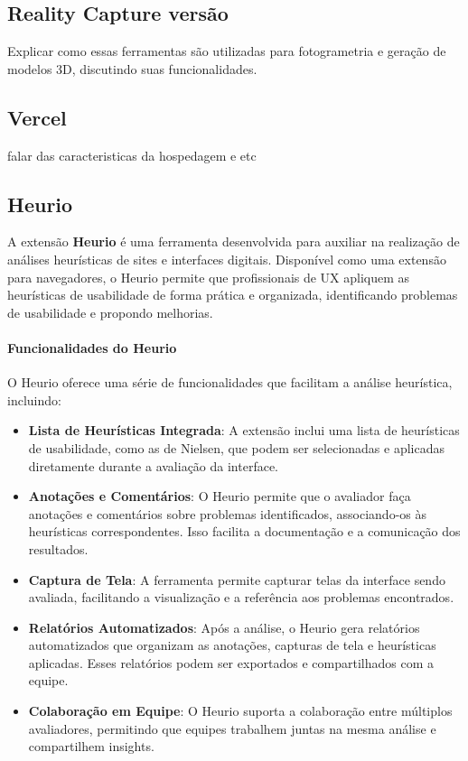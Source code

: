 \subsection{Reality Capture versão}
Explicar como essas ferramentas são utilizadas para fotogrametria e geração de modelos 3D, discutindo suas funcionalidades.

\subsection{Vercel}
falar das caracteristicas da hospedagem e etc

\subsection{Heurio}
A extensão \textbf{Heurio} é uma ferramenta desenvolvida para auxiliar na realização de análises heurísticas de sites e interfaces digitais. Disponível como uma extensão para navegadores, o Heurio permite que profissionais de UX apliquem as heurísticas de usabilidade de forma prática e organizada, identificando problemas de usabilidade e propondo melhorias.

\paragraph{Funcionalidades do Heurio}
O Heurio oferece uma série de funcionalidades que facilitam a análise heurística, incluindo:

\begin{itemize}
    \item \textbf{Lista de Heurísticas Integrada}: A extensão inclui uma lista de heurísticas de usabilidade, como as de Nielsen, que podem ser selecionadas e aplicadas diretamente durante a avaliação da interface.
    
    \item \textbf{Anotações e Comentários}: O Heurio permite que o avaliador faça anotações e comentários sobre problemas identificados, associando-os às heurísticas correspondentes. Isso facilita a documentação e a comunicação dos resultados.
    
    \item \textbf{Captura de Tela}: A ferramenta permite capturar telas da interface sendo avaliada, facilitando a visualização e a referência aos problemas encontrados.
    
    \item \textbf{Relatórios Automatizados}: Após a análise, o Heurio gera relatórios automatizados que organizam as anotações, capturas de tela e heurísticas aplicadas. Esses relatórios podem ser exportados e compartilhados com a equipe.
    
    \item \textbf{Colaboração em Equipe}: O Heurio suporta a colaboração entre múltiplos avaliadores, permitindo que equipes trabalhem juntas na mesma análise e compartilhem insights.
\end{itemize}

